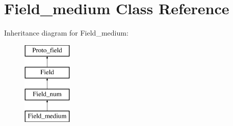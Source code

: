 \hypertarget{classField__medium}{}\section{Field\+\_\+medium Class Reference}
\label{classField__medium}
Inheritance diagram for Field\+\_\+medium\+:\begin{figure}[H]
\begin{center}
\leavevmode
\includegraphics[height=4.000000cm]{classField__medium}
\end{center}
\end{figure}

